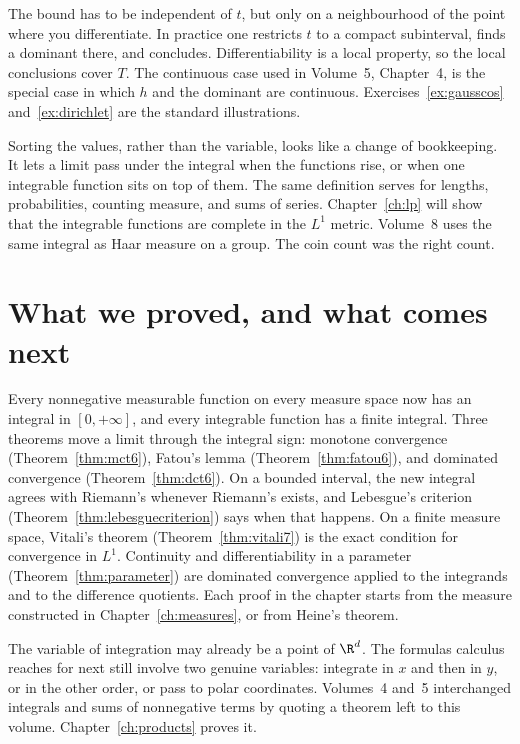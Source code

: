 The bound has to be independent of \(t\), but only on a neighbourhood of the point where you differentiate. In practice one restricts \(t\) to a compact subinterval, finds a dominant there, and concludes. Differentiability is a local property, so the local conclusions cover \(T\). The continuous case used in Volume~5, Chapter~4, is the special case in which \(h\) and the dominant are continuous. Exercises~\ref{ex:gausscos} and~\ref{ex:dirichlet} are the standard illustrations.

\begin{beauty}
Sorting the values, rather than the variable, looks like a change of bookkeeping. It lets a limit pass under the integral when the functions rise, or when one integrable function sits on top of them. The same definition serves for lengths, probabilities, counting measure, and sums of series. Chapter~\ref{ch:lp} will show that the integrable functions are complete in the \(L^1\) metric. Volume~8 uses the same integral as Haar measure on a group. The coin count was the right count.
\end{beauty}

\section{What we proved, and what comes next}

Every nonnegative measurable function on every measure space now has an integral in \([0,+\infty]\), and every integrable function has a finite integral. Three theorems move a limit through the integral sign: monotone convergence (Theorem~\ref{thm:mct6}), Fatou's lemma (Theorem~\ref{thm:fatou6}), and dominated convergence (Theorem~\ref{thm:dct6}). On a bounded interval, the new integral agrees with Riemann's whenever Riemann's exists, and Lebesgue's criterion (Theorem~\ref{thm:lebesguecriterion}) says when that happens. On a finite measure space, Vitali's theorem (Theorem~\ref{thm:vitali7}) is the exact condition for convergence in \(L^1\). Continuity and differentiability in a parameter (Theorem~\ref{thm:parameter}) are dominated convergence applied to the integrands and to the difference quotients. Each proof in the chapter starts from the measure constructed in Chapter~\ref{ch:measures}, or from Heine's theorem.

The variable of integration may already be a point of \(\R^d\). The formulas calculus reaches for next still involve two genuine variables: integrate in \(x\) and then in \(y\), or in the other order, or pass to polar coordinates. Volumes~4 and~5 interchanged integrals and sums of nonnegative terms by quoting a theorem left to this volume. Chapter~\ref{ch:products} proves it.

